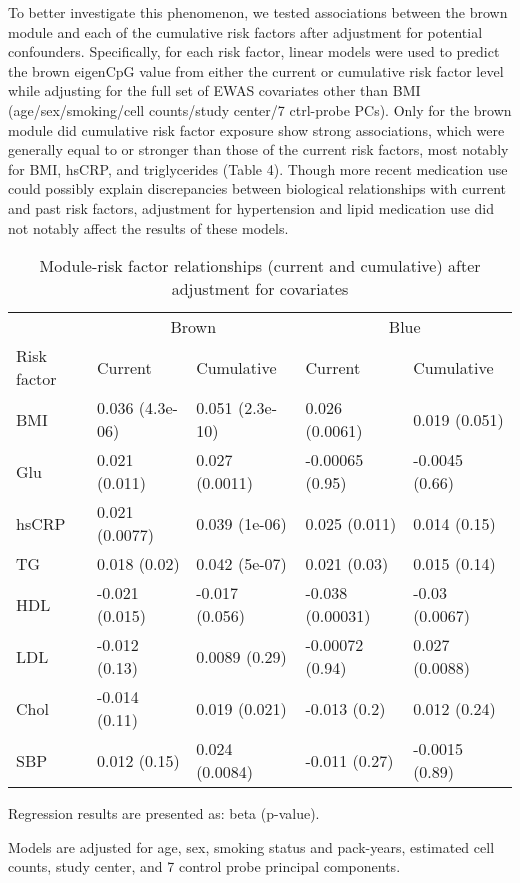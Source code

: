 \documentclass[]{bmcart}
\begin{document}
To better investigate this phenomenon, we tested associations between
the brown module and each of the cumulative risk factors after
adjustment for potential confounders. Specifically, for each risk
factor, linear models were used to predict the brown eigenCpG value
from either the current or cumulative risk factor level while adjusting
for the full set of EWAS covariates other than BMI (age/sex/smoking/cell
counts/study center/7 ctrl-probe PCs). Only for the brown module did
cumulative risk factor exposure show strong associations, which were
generally equal to or stronger than those of the current risk factors,
most notably for BMI, hsCRP, and triglycerides (Table 4). Though more
recent medication use could possibly explain discrepancies between
biological relationships with current and past risk factors, adjustment
for hypertension and lipid medication use did not notably affect the
results of these models.

\begin{table}[t]

\caption{\label{tab:cumulative-adjusted}Module-risk factor relationships (current and cumulative) after adjustment for covariates}
\centering
\begin{threeparttable}
\begin{tabular}{lllll}
\toprule
\multicolumn{1}{c}{} & \multicolumn{2}{c}{Brown} & \multicolumn{2}{c}{Blue} \\
\cmidrule(l{3pt}r{3pt}){2-3} \cmidrule(l{3pt}r{3pt}){4-5}
Risk factor & Current & Cumulative & Current & Cumulative\\
\midrule
BMI & 0.036 (4.3e-06) & 0.051 (2.3e-10) & 0.026 (0.0061) & 0.019 (0.051)\\
Glu & 0.021 (0.011) & 0.027 (0.0011) & -0.00065 (0.95) & -0.0045 (0.66)\\
hsCRP & 0.021 (0.0077) & 0.039 (1e-06) & 0.025 (0.011) & 0.014 (0.15)\\
TG & 0.018 (0.02) & 0.042 (5e-07) & 0.021 (0.03) & 0.015 (0.14)\\
HDL & -0.021 (0.015) & -0.017 (0.056) & -0.038 (0.00031) & -0.03 (0.0067)\\
\addlinespace
LDL & -0.012 (0.13) & 0.0089 (0.29) & -0.00072 (0.94) & 0.027 (0.0088)\\
Chol & -0.014 (0.11) & 0.019 (0.021) & -0.013 (0.2) & 0.012 (0.24)\\
SBP & 0.012 (0.15) & 0.024 (0.0084) & -0.011 (0.27) & -0.0015 (0.89)\\
\bottomrule
\end{tabular}
\begin{tablenotes}
\item * Regression results are presented as: beta (p-value).
\item * Models are adjusted for age, sex, smoking status and pack-years, estimated cell counts, study center, and 7 control probe principal components.
\end{tablenotes}
\end{threeparttable}
\end{table}
\end{document}
